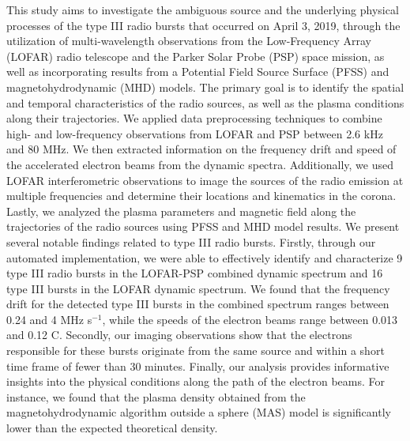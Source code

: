 \documentclass[12pt, a4paper]{report}
\begin{document}
This study aims to investigate the ambiguous source and the underlying physical processes of the type III radio bursts that occurred on April 3, 2019, through the utilization of multi-wavelength observations from the Low-Frequency Array (LOFAR) radio telescope and the Parker Solar Probe (PSP) space mission, as well as incorporating results from a Potential Field Source Surface (PFSS) and magnetohydrodynamic (MHD) models. The primary goal is to identify the spatial and temporal characteristics of the radio sources, as well as the plasma conditions along their trajectories.
We applied data preprocessing techniques to combine high- and low-frequency observations from LOFAR and PSP between 2.6 kHz and 80 MHz. We then extracted information on the frequency drift and speed of the accelerated electron beams from the dynamic spectra. Additionally, we used LOFAR interferometric observations to image the sources of the radio emission at multiple frequencies and determine their locations and kinematics in the corona. Lastly, we analyzed the plasma parameters and magnetic field along the trajectories of the radio sources using PFSS and MHD model results.
We present several notable findings related to type III radio bursts. Firstly, through our automated implementation, we were able to effectively identify and characterize 9 type III radio bursts in the LOFAR-PSP combined dynamic spectrum and 16 type III bursts in the LOFAR dynamic spectrum. We found that the frequency drift for the detected type III bursts in the combined spectrum ranges between 0.24 and 4 MHz s$^{-1}$, while the speeds of the electron beams range between 0.013 and 0.12 C. Secondly, our imaging observations show that the electrons responsible for these bursts originate from the same source and within a short time frame of fewer than 30 minutes. Finally, our analysis provides informative insights into the physical conditions along the path of the electron beams. For instance, we found that the plasma density obtained from the magnetohydrodynamic algorithm outside a sphere (MAS) model is significantly lower than the expected theoretical density.
   
\end{document}
